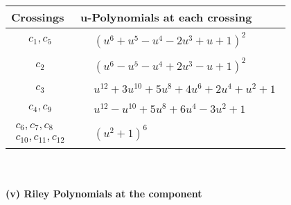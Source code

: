 \documentclass[1p]{elsarticle_modified}
\theoremstyle{definition}
\begin{document}
\begin{tabular}{m{50pt}|m{274pt}}
Crossings & \hspace{64pt}u-Polynomials at each crossing \\
\hline $$\begin{aligned}c_{1},c_{5}\end{aligned}$$&$\begin{aligned}
&(u^6+u^5- u^4-2 u^3+u+1)^2
\end{aligned}$\\
\hline $$\begin{aligned}c_{2}\end{aligned}$$&$\begin{aligned}
&(u^6- u^5- u^4+2 u^3- u+1)^2
\end{aligned}$\\
\hline $$\begin{aligned}c_{3}\end{aligned}$$&$\begin{aligned}
&u^{12}+3 u^{10}+5 u^8+4 u^6+2 u^4+u^2+1
\end{aligned}$\\
\hline $$\begin{aligned}c_{4},c_{9}\end{aligned}$$&$\begin{aligned}
&u^{12}- u^{10}+5 u^8+6 u^4-3 u^2+1
\end{aligned}$\\
\hline $$\begin{aligned}c_{6},c_{7},c_{8}\\c_{10},c_{11},c_{12}\end{aligned}$$&$\begin{aligned}
&(u^2+1)^6
\end{aligned}$\\
\hline
\end{tabular}\\~\\
\newpage\renewcommand{\arraystretch}{1}
\flushleft \textbf{(v) Riley Polynomials at the component}\newline \\
\end{document}
